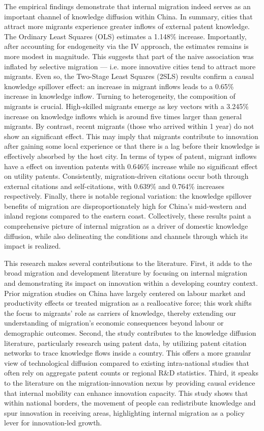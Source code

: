 \documentclass[12pt]{article}
\begin{document}
The empirical findings demonstrate that internal migration indeed serves as an important channel of knowledge diffusion within China. In summary, cities that attract more migrants experience greater inflows of external patent knowledge. The Ordinary Least Squares (OLS) estimates a 1.148\% increase. Importantly, after accounting for endogeneity via the IV approach, the estimates remains is more modest in magnitude. This suggests that part of the naive association was inflated by selective migration --- i.e. more innovative cities tend to attract more migrants. Even so, the Two-Stage Least Squares (2SLS) results confirm a causal knowledge spillover effect: an increase in migrant inflows leads to a 0.65\% increase in knowledge inflow. Turning to heterogeneity, the composition of migrants is crucial. 
High-skilled migrants emerge as key vectors with a 3.245\% increase on knowledge inflows which is around five times larger than general migrants. By contrast, recent migrants (those who arrived within 1 year) do not show an significant effect. This may imply that migrants contribute to innovation after gaining some local experience or that there is a lag before their knowledge is effectively absorbed by the host city. 
In terms of types of patent, migrant inflows have a effect on invention patents with 0.646\% increase while no significant effect on utility patents.
Consistently, migration-driven citations occur both through external citations and self-citations, with 0.639\% and 0.764\% increases respectively. 
Finally, there is notable regional variation: the knowledge spillover benefits of migration are disproportionately high for China's mid-western and inland regions compared to the eastern coast. 
Collectively, these results paint a comprehensive picture of internal migration as a driver of domestic knowledge diffusion, while also delineating the conditions and channels through which its impact is realized.

This research makes several contributions to the literature. First, it adds to the broad migration and development literature by focusing on internal migration and demonstrating its impact on innovation within a developing country context. Prior migration studies on China have largely centered on labour market and productivity effects or treated migration as a reallocative force; this work shifts the focus to migrants' role as carriers of knowledge, thereby extending our understanding of migration's economic consequences beyond labour or demographic outcomes. Second, the study contributes to the knowledge diffusion literature, particularly research using patent data, by utilizing patent citation networks to trace knowledge flows inside a country. This offers a more granular view of technological diffusion compared to existing intra-national studies that often rely on aggregate patent counts or regional R\&D statistics. Third, it speaks to the literature on the migration-innovation nexus by providing causal evidence that internal mobility can enhance innovation capacity. This study shows that within national borders, the movement of people can redistribute knowledge and spur innovation in receiving areas, highlighting internal migration as a policy lever for innovation-led growth. 
\end{document}
